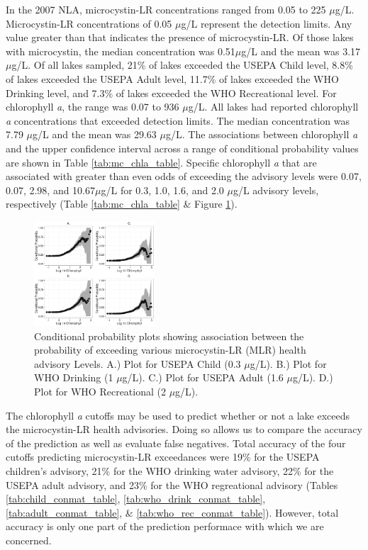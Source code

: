 \documentclass[10pt,a4paper,twocolumn]{article}
\begin{document}
In the 2007 NLA, microcystin-LR concentrations ranged from 0.05 to 225
\(\mu\)g/L. Microcystin-LR concentrations of 0.05 \(\mu\)g/L represent
the detection limits. Any value greater than that indicates the presence
of microcystin-LR. Of those lakes with microcystin, the median
concentration was 0.51\(\mu\)g/L and the mean was 3.17\(\mu\)g/L. Of all
lakes sampled, 21\% of lakes exceeded the USEPA Child level, 8.8\% of
lakes exceeded the USEPA Adult level, 11.7\% of lakes exceeded the WHO
Drinking level, and 7.3\% of lakes exceeded the WHO Recreational level.
For chlorophyll \emph{a}, the range was 0.07 to 936 \(\mu\)g/L. All
lakes had reported chlorophyll \emph{a} concentrations that exceeded
detection limits. The median concentration was 7.79 \(\mu\)g/L and the
mean was 29.63 \(\mu\)g/L. The associations between chlorophyll \emph{a}
and the upper confidence interval across a range of conditional
probability values are shown in Table \ref{tab:mc_chla_table}. Specific
chlorophyll \emph{a} that are associated with greater than even odds of
exceeding the advisory levels were 0.07, 0.07, 2.98, and 10.67\(\mu\)g/L
for 0.3, 1.0, 1.6, and 2.0 \(\mu\)g/L advisory levels, respectively
(Table \ref{tab:mc_chla_table} \& Figure \ref{fig:multi_cp_plot}).

\begin{figure}
\centering
\includegraphics[width=0.4\textwidth]{hollister_microcystin_fig1.jpg}
\caption{\label{fig:multi_cp_plot}Conditional probability plots showing association between the probability of exceeding various microcystin-LR (MLR) health advisory Levels. A.) Plot for USEPA Child (0.3 $\mu$g/L). B.) Plot for WHO Drinking (1 $\mu$g/L). C.) Plot for USEPA Adult (1.6 $\mu$g/L). D.) Plot for WHO Recreational (2 $\mu$g/L).  }
\end{figure}

The chlorophyll \emph{a} cutoffs may be used to predict whether or not a
lake exceeds the microcystin-LR health advisories. Doing so allows us to
compare the accuracy of the prediction as well as evaluate false
negatives. Total accuracy of the four cutoffs predicting microcystin-LR
exceedances were 19\% for the USEPA children's advisory, 21\% for the
WHO drinking water advisory, 22\% for the USEPA adult advisory, and 23\%
for the WHO regreational advisory (Tables \ref{tab:child_conmat_table},
\ref{tab:who_drink_conmat_table}, \ref{tab:adult_conmat_table}, \&
\ref{tab:who_rec_conmat_table}). However, total accuracy is only one
part of the prediction performace with which we are concerned.
\end{document}
